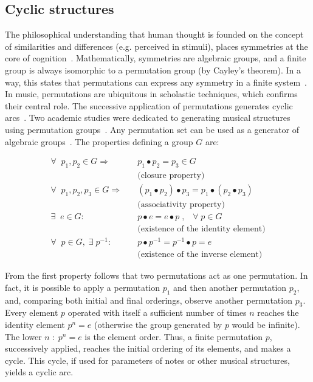\subsection{Cyclic structures}\label{estCic}
The philosophical understanding that human thought is founded on the concept of similarities and differences (e.g. perceived in stimuli), places symmetries
at the core of cognition~\cite{Deleuze}. Mathematically, symmetries are algebraic groups, and a finite group is always isomorphic to a permutation
group (by Cayley's theorem).
In a way, this states that permutations can express any symmetry in a
finite system~\cite{gruposFascination}.
In music, permutations are ubiquitous in scholastic techniques,
 which confirms their central role.
The successive application of permutations generates cyclic arcs~\cite{change,Zamacois,permMusic}. Two academic studies were dedicated to generating musical structures using permutation groups~\cite{figgusOriginal, figgusEspacializacao}. Any permutation set can be used as a generator of algebraic groups~\cite{permMusic}.
The properties defining a group $G$ are:

\begin{equation}\label{eq:groups}
\begin{split}
\forall \;\; p_1,p_2 \in G \Rightarrow  \quad   & p_1 \bullet p_2  = p_3 \in G \\ 
     & \text{(closure property)} \\
\forall \;\; p_1,p_2,p_3 \in G \Rightarrow \quad & (p_1\bullet p_2)\bullet p_3  = p_1\bullet (p_2\bullet p_3) \\
     & \text{(associativity property)} \\
\exists \;\; e \in G :                  \quad    & p \bullet e  = e \bullet p \;,\;\;\; \forall\; p \in G  \\ 
     &  \text{(existence of the identity element)} \\
\forall \;\; p \in G, \;\exists\; p^{-1} :\quad  &  p\bullet p^{-1} =p^{-1}\bullet p = e \\
     &  \text{(existence of the inverse element)}
\end{split}
\end{equation}

From the first property follows that two permutations act as one permutation. In fact, it is possible to apply a
permutation $p_1$ and then another permutation $p_2$, and, comparing both initial and final orderings, observe another permutation $p_3$. Every element $p$ operated with itself a sufficient number of times $n$ reaches the identity element $p^n=e$ (otherwise the group generated by $p$ would be infinite). The lower $n\;:\;p^n=e$ is the element order. Thus, a finite
permutation $p$, successively applied, reaches the initial ordering of its
elements, and makes a cycle. This cycle, if used for parameters of notes or other musical structures,
yields a cyclic arc.

